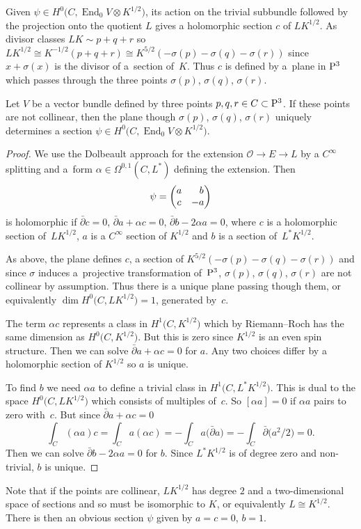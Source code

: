 \documentclass[pdftex]{sigma}
\def\End{\operatorname{End}}
\newcommand{\PP}{{\rm P}}
\newcommand{\OO}{{\mathcal O}}
\begin{document}
Given $\psi\in H^0\big(C,\End_0V\otimes K^{1/2}\big)$, its action on the trivial subbundle followed by the projection onto the quotient $L$ gives a holomorphic section $c$ of $LK^{1/2}$. As divisor classes $LK\sim p+q+r$ so $LK^{1/2}\cong K^{-1/2}(p+q+r)\cong K^{5/2}(-\sigma(p)-\sigma(q)-\sigma(r))$ since $x+\sigma(x)$ is the divisor of a~section of~$K$. Thus $c$ is defined by a~plane in $\PP^3$ which passes through the three points $\sigma(p)$, $\sigma(q)$, $\sigma(r)$.
\begin{proposition} Let $V$ be a vector bundle defined by three points $p,q,r\in C\subset \PP^3$. If these points are not collinear, then the plane though $\sigma(p)$, $\sigma(q)$, $\sigma(r)$ uniquely determines a section $\psi \in H^0\big(C,\End_0V\otimes K^{1/2}\big)$.
\end{proposition}
\begin{proof}
We use the Dolbeault approach for the extension $\OO \rightarrow E\rightarrow L$ by a $C^{\infty}$ splitting and a~form $\alpha\in \Omega^{0,1}(C, L^*)$ defining the extension. Then
\begin{displaymath}\psi=
\begin{pmatrix} a & \hphantom{-}b \cr
c & -a
\end{pmatrix}
\end{displaymath}
is holomorphic if
$\bar\partial c=0$, $\bar\partial a+\alpha c=0$, $\bar\partial b - 2\alpha a=0$,
where $c$ is a holomorphic section of~$LK^{1/2}$, $a$ is a $C^{\infty}$ section of $K^{1/2}$ and $b$ is a section of~$L^*K^{1/2}$.

As above, the plane defines $c$, a section of $K^{5/2}(-\sigma(p)-\sigma(q)-\sigma(r))$ and since $\sigma$ induces a~projective transformation of~$\PP^3$, $\sigma(p)$, $\sigma(q)$, $\sigma(r)$ are not collinear by assumption. Thus there is a unique plane passing though them, or equivalently $\dim H^0\big(C,LK^{1/2}\big)=1$, generated by~$c$.

The term $\alpha c$ represents a class in $H^1\big(C,K^{1/2}\big)$ which by Riemann--Roch has the same dimension as $H^0\big(C,K^{1/2}\big)$. But this is zero since $K^{1/2}$ is an even
spin structure. Then we can solve $\bar\partial a+\alpha c=0$ for $a$. Any two choices differ by a holomorphic section of $K^{1/2}$ so $a$ is unique.

To find $b$ we need $\alpha a$ to define a trivial class in $H^1\big(C, L^*K^{1/2}\big)$. This is dual to the space $H^0\big(C,LK^{1/2}\big)$ which consists of multiples of~$c$.
 So $[\alpha a]=0$ if $\alpha a$ pairs to zero with~$c$.
 But since $\bar\partial a+\alpha c=0$
\[
\int_C (\alpha a) c= \int_C a (\alpha c)=-\int_Ca\big(\bar\partial a\big) =-\int_C\bar\partial \big(a^2/2\big)=0.
\]
Then we can solve $\bar\partial b - 2\alpha a=0$ for $b$. Since $L^*K^{1/2}$ is of degree zero and non-trivial, $b$ is unique.
\end{proof}
\begin{remark}
Note that if the points are collinear, $L K^{1/2}$ has degree $2$ and a two-dimensional space of sections and so must be isomorphic to $K$, or equivalently $L\cong K^{1/2}$. There is then an obvious section $\psi$ given by $a=c=0$, $b=1$.
\end{remark}
\end{document}
